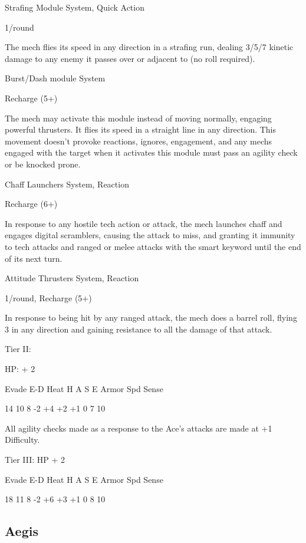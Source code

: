 Strafing Module  
System, Quick Action
 
1/round
 
The mech flies its speed in any direction in a strafing run, dealing 3/5/7 kinetic damage to any  
enemy it passes over or adjacent to (no roll required).
 

Burst/Dash module  
System
 
Recharge (5+)
 
The mech may activate this module instead of moving normally, engaging powerful thrusters. It  
flies its speed in a straight line in any direction. This movement doesn’t provoke reactions,  
ignores, engagement, and any mechs engaged with the target when it activates this module  
must pass an agility check or be knocked prone.
 

Chaff Launchers  
System, Reaction
 
Recharge (6+)
 
In response to any hostile tech action or attack, the mech launches chaff and engages digital  
scramblers, causing the attack to miss, and granting it immunity to tech attacks and ranged or  
melee attacks with the smart keyword until the end of its next turn.
 

Attitude Thrusters  
System, Reaction
 
1/round, Recharge (5+)
 
In response to being hit by any ranged attack, the mech does a barrel roll, flying 3 in any  
direction and gaining resistance to all the damage of that attack.
 

Tier II:
 
HP: + 2
 

          Evade    E-D    Heat    H     A     S    E        Armor       Spd       Sense 

          14       10     8       -2    +4    +2   +1       0            7        10 

All agility checks made as a response to the Ace’s attacks are made at +1 Difficulty.
 

Tier III:  
HP + 2
 

          Evade    E-D    Heat    H     A     S    E        Armor       Spd       Sense 

          18       11     8       -2    +6    +3   +1       0           8         10 

                                                                                                               
\subsection{Aegis}

